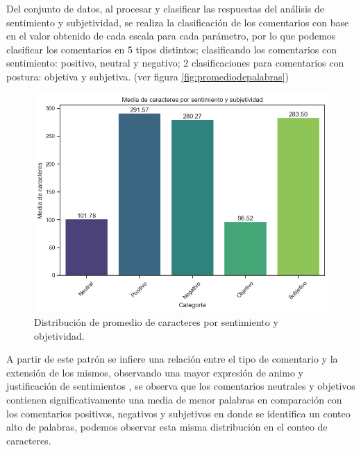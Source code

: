 Del conjunto de datos, al procesar y clasificar las respuestas del análisis de sentimiento y subjetividad, se realiza la clasificación de los comentarios con base en el valor obtenido de cada escala para cada parámetro, por lo que podemos clasificar los comentarios en 5 tipos distintos; clasificando los comentarios con sentimiento: positivo, neutral y negativo; 2 clasificaciones para comentarios con postura: objetiva y subjetiva. (ver figura \ref{fig:promediodepalabras})\\

\begin{figure}[h!]
	\centering
	\includegraphics[width=12cm]{Images/Promedio_de_caracteres}
	\caption{Distribución de promedio de caracteres por sentimiento y objetividad.}
	\label{fig:promediodecaracteres}
\end{figure}

A partir de este patrón se infiere una relación entre el tipo de comentario y la extensión de los mismos, observando una mayor expresión de animo y justificación de sentimientos , se observa que los comentarios neutrales y objetivos contienen significativamente una media de menor palabras en comparación con los comentarios positivos, negativos y subjetivos en donde se identifica un conteo alto de palabras, podemos observar esta misma distribución en el conteo de caracteres.\\

